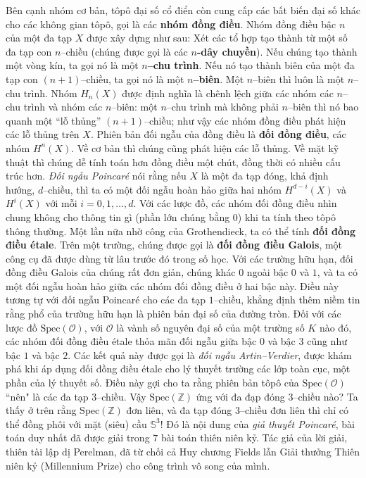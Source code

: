 \begin{multicols}{2}
	Bên cạnh nhóm cơ bản, tôpô đại số cổ điển còn cung cấp các bất biến đại số khác cho các không gian tôpô, gọi là các {\bf\color{duongvaotoanhoc} nhóm đồng điều}. Nhóm đồng điều bậc $n$ của một đa tạp $X$ được xây dựng như sau: Xét các tổ hợp tạo thành từ một số đa tạp con $n$--chiều (chúng được gọi là các {\bf\color{duongvaotoanhoc} $n$-dây chuyền}). Nếu chúng tạo thành một vòng kín, ta gọi nó là một {\bf\color{duongvaotoanhoc} $n$--chu trình}. Nếu nó tạo thành biên của một đa tạp con $(n+1)$--chiều, ta gọi nó là một {\bf\color{duongvaotoanhoc} $n$--biên}. Một $n$--biên thì luôn là một $n$--chu trình. Nhóm $H_n(X)$ được định nghĩa là chênh lệch giữa các nhóm các $n$--chu trình và nhóm các $n$--biên: một $n$--chu trình mà không phải $n$--biên thì nó bao quanh một ``lỗ thủng'' $(n+1)$--chiều; như vậy các nhóm đồng điều phát hiện các lỗ thủng trên $X$. Phiên bản đối ngẫu của đồng điều là {\bf\color{duongvaotoanhoc} đối đồng điều}, các nhóm $H^n(X)$. Về cơ bản thì chúng cũng phát hiện các lỗ thủng. Về mặt kỹ thuật thì chúng dễ tính toán hơn đồng điều một chút, đồng thời có nhiều cấu trúc hơn. {\it Đối ngẫu Poincaré} nói rằng nếu $X$ là một đa tạp đóng, khả định hướng, $d$--chiều, thì ta có một đối ngẫu hoàn hảo giữa hai nhóm $H^{d-i}(X)$ và $H^i(X)$ với mỗi $i = 0,1,\ldots,d$.
	\vskip 0.1cm
	Với các lược đồ, các nhóm đối đồng điều nhìn chung không cho thông tin gì (phần lớn chúng bằng $0$) khi ta tính theo tôpô thông thường. Một lần nữa nhờ công của Grothendieck, ta có thể tính {\bf\color{duongvaotoanhoc}đối đồng điều étale}.  Trên một trường, chúng được gọi là {\bf\color{duongvaotoanhoc}đối đồng điều Galois}, một công cụ đã được dùng từ lâu trước đó trong số học. Với các trường hữu hạn, đối đồng điều Galois của chúng rất đơn giản, chúng khác $0$ ngoài bậc $0$ và $1$, và ta có một đối ngẫu hoàn hảo giữa các nhóm đối đồng điều ở hai bậc này. Điều này tương tự với đối ngẫu Poincaré cho các đa tạp $1$--chiều, khẳng định thêm niềm tin rằng phổ của trường hữu hạn là phiên bản đại số của đường tròn. 
	\vskip 0.1cm
	Đối với các lược đồ $\text{Spec}(\mathcal{O})$, với $\mathcal{O}$ là vành số nguyên đại số của một trường số $K$ nào đó, các nhóm đối đồng điều étale thỏa mãn đối ngẫu giữa bậc $0$ và bậc $3$ cũng như bậc $1$ và bậc $2$. Các kết quả này được gọi là {\it đối ngẫu Artin--Verdier}, được khám phá khi áp dụng đối đồng điều étale cho lý thuyết trường các lớp toàn cục, một phần của lý thuyết số. Điều này gợi cho ta rằng phiên bản tôpô của $\text{Spec}(\mathcal{O})$ ``nên" là các đa tạp $3$--chiều. Vậy $\text{Spec}(\mathbb{Z})$ ứng với đa đạp đóng $3$--chiều nào? Ta thấy ở trên rằng $\text{Spec}(\mathbb{Z})$ đơn liên, và đa tạp đóng $3$--chiều đơn liên thì chỉ có thể đồng phôi với mặt (siêu) cầu  $\mathbb{S}^3$! Đó là nội dung của {\it giả thuyết Poincaré}, bài toán duy nhất đã được giải trong $7$ bài toán thiên niên kỷ. Tác giả của lời giải, thiên tài lập dị Perelman, đã từ chối cả Huy chương Fields lẫn Giải thưởng Thiên niên kỷ (Millennium Prize) cho công trình vô song của mình.

\end{multicols}
